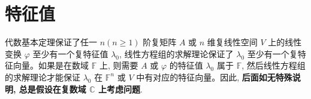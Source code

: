 \documentclass[../main.tex]{subfiles} %
\begin{document}
\chapter{特征值}

\begin{remark}
代数基本定理保证了任一 $n(n \geqslant  1)$ 阶复矩阵 $A$ 或 $n$ 维复线性空间 $V$ 上的线性变换 $\varphi$ 至少有一个复特征值 $\lambda_0$, 线性方程组的求解理论保证了 $\lambda_0$ 至少有一个复特征向量。如果是在数域 $\mathbb{F}$ 上, 则需要 $A$ 或 $\varphi$ 的特征值 $\lambda_0$ 属于 $\mathbb{F}$, 然后线性方程组的求解理论才能保证 $\lambda_0$ 在 $\mathbb{F}^n$ 或 $V$ 中有对应的特征向量。因此, \textbf{后面如无特殊说明, 总是假设在复数域 $\mathbb{C}$ 上考虑问题}.
\end{remark}




















\end{document}

